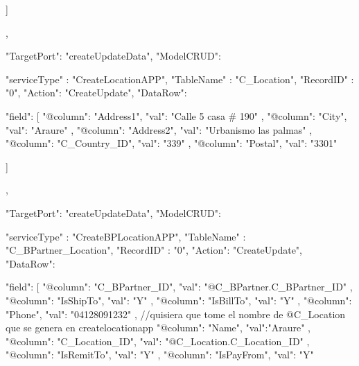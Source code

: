 {{{{{{                ]
                }

                }

                },
                {
                "TargetPort": "createUpdateData",
                "ModelCRUD": {
                "serviceType" : "CreateLocationAPP",
                "TableName" : "C_Location",
                "RecordID" : "0",
                "Action": "CreateUpdate",
                 "DataRow": {
                "field": [
                    {
                        "@column": "Address1",
                        "val": "Calle 5 casa # 190"
                    },
                    {
                        "@column": "City",
                        "val": "Araure"
                    },
                    {
                        "@column": "Address2",
                        "val": "Urbanismo las palmas"
                    },
                    {
                        "@column": "C_Country_ID",
                        "val": "339"
                    },
                    {
                        "@column": "Postal",
                        "val": "3301"
                    }
                 
                ]
                }


                }

                
                
                },
                {
                "TargetPort": "createUpdateData",
                "ModelCRUD": {
                "serviceType" : "CreateBPLocationAPP",
                "TableName" : "C_BPartner_Location",
                "RecordID" : "0",
                "Action": "CreateUpdate",
                 "DataRow": {
                "field": [
                    {
                        "@column": "C_BPartner_ID",
                        "val": "@C_BPartner.C_BPartner_ID"
                    },
                     {
                        "@column": "IsShipTo",
                        "val": "Y"
                    },
                       {
                        "@column": "IsBillTo",
                        "val": "Y"
                    },
                       {
                        "@column": "Phone",
                        "val": "04128091232"
                    },
                    {
                        //quisiera que tome el nombre de @C_Location que se genera en createlocationapp
                        "@column": "Name",
                        "val":"Araure"
                    },
                    {
                        "@column": "C_Location_ID",
                        "val": "@C_Location.C_Location_ID"
                    },
                    {
                        "@column": "IsRemitTo",
                        "val": "Y"
                    },
                    {
                        "@column": "IsPayFrom",
                        "val": "Y"
                    }
                 
}}}}}}
